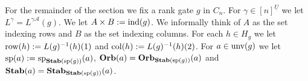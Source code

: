 \documentclass[../paper.tex]{subfiles}
\begin{document}
For the remainder of the section we fix a rank gate $g$ in $C_n$. For $\gamma
\in [n]^{\underline{U}}$ we let $L^{\gamma} = L^{\gamma \mathcal{A}}(g)$. We let
$A \times B := \text{\upshape ind}(g)$. We informally think of $A$ as the set indexing rows and
$B$ as the set indexing columns. For each $h \in H_g$ we let $\text{row}(h) :=
L(g)^{-1}(h)(1)$ and $\text{col}(h) := L(g)^{-1}(h)(2)$. For $a \in \text{unv}(g)$
we let $\text{sp}(a) := \text{sp}_{\text{\textbf{Stab}} (\text{sp} (g))}(a)$, $\text{\textbf{Orb}}(a) = \text{\textbf{Orb}}_{\text{\textbf{Stab}} (\text{sp} (g))}(a)$
and $\text{\textbf{Stab}}(a) = \text{\textbf{Stab}}_{\text{\textbf{Stab}} (\text{sp} (g))}(a)$.





\end{document}
